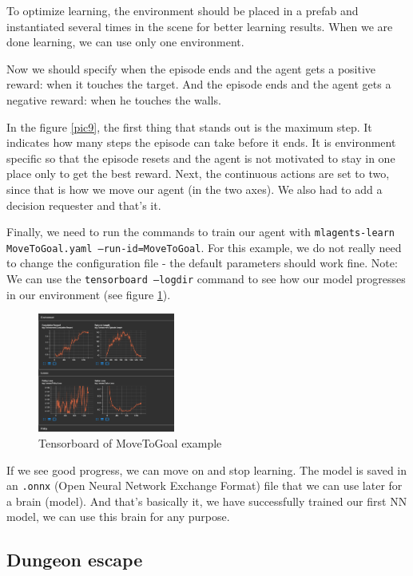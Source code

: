 \documentclass[a4paper,12pt,openright]{book}
\begin{document}
To optimize learning, the environment should be placed in a prefab and instantiated several times in the scene for better learning results. When we are done learning, we can use only one environment.

Now we should specify when the episode ends and the agent gets a positive reward: when it touches the target. 
And the episode ends and the agent gets a negative reward: when he touches the walls.

In the figure \ref{pic9}, the first thing that stands out is the maximum step. It indicates how many steps the episode can take before it ends. It is environment specific so that the episode resets and the agent is not motivated to stay in one place only to get the best reward. Next, the continuous actions are set to two, since that is how we move our agent (in the two axes). We also had to add a decision requester and that's it.

Finally, we need to run the commands to train our agent with \texttt{mlagents-learn MoveToGoal.yaml --run-id=MoveToGoal}. For this example, we do not really need to change the configuration file - the default parameters should work fine. Note: We can use the \texttt{tensorboard --logdir} command to see how our model progresses in our environment (see figure \ref{pic10}).

\begin{figure}[ht]
\begin{center}
\includegraphics[width=0.4\textwidth]{Images/tensorboard.png}
\end{center}
\caption{Tensorboard of MoveToGoal example}
\label{pic10}
\end{figure}

If we see good progress, we can move on and stop learning. The model is saved in an \texttt{.onnx} (Open Neural Network Exchange Format) file that we can use later for a brain (model). And that's basically it, we have successfully trained our first NN model, we can use this brain for any purpose.

\subsection{Dungeon escape}
\end{document}
